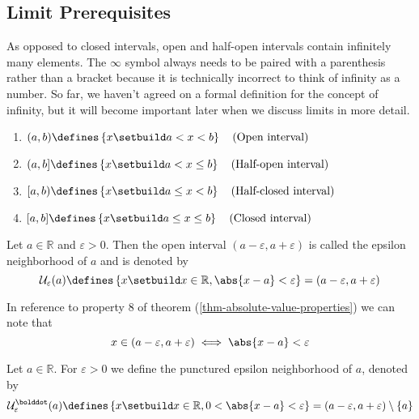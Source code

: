 \subsection{Limit Prerequisites}\label{subsec-limit-prerequisites}

\begin{definition}\label{def-interval-notation}
	As opposed to closed intervals, open and half-open intervals contain infinitely
	many elements. The $\infty$ symbol always needs to be paired with a parenthesis
	rather than a bracket because it is technically incorrect to think of infinity
	as a number. So far, we haven't agreed on a formal definition for the concept
	of infinity, but it will become important later when we discuss limits in more
	detail.
	\begin{enumerate}
		\item $(a,b)\defines\left\{x\setbuild a < x < b\right\}       \quad \text{(Open interval)}$
		\item $(a,b]\defines\left\{x\setbuild a < x \leq b\right\}    \quad \text{(Half-open interval)}$
		\item $[a,b)\defines\left\{x\setbuild a \leq x < b\right\}    \quad \text{(Half-closed interval)}$
		\item $[a,b]\defines\left\{x\setbuild a \leq x \leq b\right\} \quad \text{(Closed interval)}$
	\end{enumerate}
\end{definition}

\begin{definition}\label{def-epsilon-neighborhood}
	Let $a\in\mathbb{R}$ and $\varepsilon > 0$. Then the open interval
	$(a-\varepsilon,a+\varepsilon)$ is called the epsilon neighborhood of $a$
	and is denoted by
	\begin{equation}
		\mathcal{U}_\varepsilon(a)\defines
		\left\{x \setbuild x\in\mathbb{R},\abs{x-a}<\varepsilon \right\}=
		(a-\varepsilon,a+\varepsilon)
	\end{equation}
\end{definition}

\begin{rem}\label{rem-epsilon-neighborhood}
	In reference to property 8 of theorem (\ref{thm-absolute-value-properties})
	we can note that
	\begin{equation}
		x\in(a-\varepsilon,a+\varepsilon) \iff \abs{x-a} < \varepsilon
	\end{equation}
\end{rem}

\begin{definition}\label{def-epsilon-punctured-neighborhood}
	Let $a\in\mathbb{R}$. For $\varepsilon>0$ we define the punctured epsilon
	neighborhood of $a$, denoted by
	\begin{equation}
		\mathcal{U}_{\varepsilon}^{\bolddot}(a)\defines
		\left\{x \setbuild x\in\mathbb{R}, 0<\abs{x-a}<\varepsilon\right\}=
		(a-\varepsilon,a+\varepsilon)\setminus\{a\}
	\end{equation}
\end{definition}

